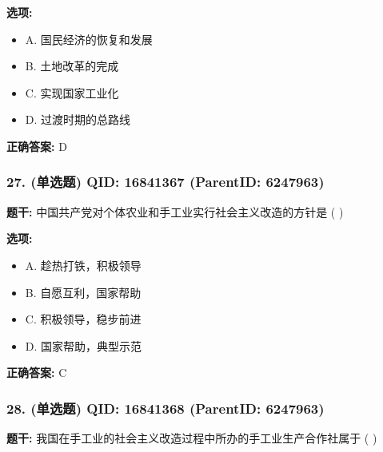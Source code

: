 \documentclass[12pt,UTF8]{ctexart}
\begin{document}
\textbf{选项:}
\begin{itemize}[leftmargin=*]

  \item A. 国民经济的恢复和发展

  \item B. 土地改革的完成

  \item C. 实现国家工业化

  \item D. 过渡时期的总路线

\end{itemize}

\textbf{正确答案:}
D

\vspace{0.3em}\hrulefill\vspace{0.7em}

\subsubsection*{27. (单选题) \small QID: 16841367 (ParentID: 6247963)}

\textbf{题干:}
中国共产党对个体农业和手工业实行社会主义改造的方针是 ( )



\textbf{选项:}
\begin{itemize}[leftmargin=*]

  \item A. 趁热打铁，积极领导

  \item B. 自愿互利，国家帮助

  \item C. 积极领导，稳步前进

  \item D. 国家帮助，典型示范

\end{itemize}

\textbf{正确答案:}
C

\vspace{0.3em}\hrulefill\vspace{0.7em}

\subsubsection*{28. (单选题) \small QID: 16841368 (ParentID: 6247963)}

\textbf{题干:}
我国在手工业的社会主义改造过程中所办的手工业生产合作社属于 ( )
\end{document}
